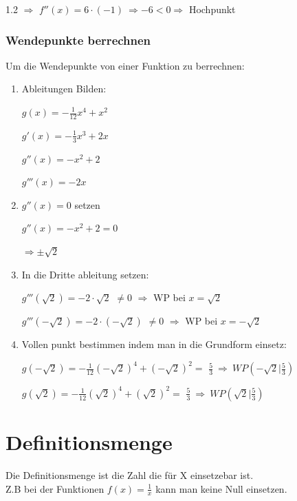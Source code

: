 \documentclass{article}
\newcommand{\Zeilenabstand}{1.2}
\begin{document}
\begin{spacing}{\Zeilenabstand}
    $\Rightarrow$ $f''(x)=6 \cdot (-1) \ \Rightarrow -6 < 0 \Rightarrow$ Hochpunkt

    \subsubsection{Wendepunkte berrechnen}

    Um die Wendepunkte von einer Funktion zu berrechnen:

    \begin{enumerate}
        \item Ableitungen Bilden:

        $g(x)=-\frac{1}{12}x^4+x^2$

        $g'(x)=-\frac{1}{3}x^3+2x$

        $g''(x)=-x^2 + 2$

        $g'''(x)=-2x$

        \item $g''(x)=0$ setzen

        $g''(x)=-x^2+2 = 0$

        $\Rightarrow \pm\sqrt{2}$

        \item In die Dritte ableitung setzen:

        $g'''(\sqrt{2})=-2 \cdot \sqrt{2}$ $\neq 0$ $\Rightarrow$ WP bei $x = \sqrt{2}$

        $g'''(-\sqrt{2})=-2 \cdot (-\sqrt{2})$ $\neq 0$ $\Rightarrow$ WP bei $x = -\sqrt{2}$

        \item Vollen punkt bestimmen indem man in die Grundform einsetz:

        $g(-\sqrt{2})=-\frac{1}{12}(-\sqrt{2})^4+(-\sqrt{2})^2=$  $\frac{5}{3} \ \Rightarrow \ WP(-\sqrt{2} \vert \frac{5}{3}) $

        $g(\sqrt{2})=-\frac{1}{12}(\sqrt{2})^4+(\sqrt{2})^2=$ $\frac{5}{3} \ \Rightarrow \ WP(\sqrt{2} \vert \frac{5}{3}) $



    \end{enumerate}

    \newpage

    \section{Definitionsmenge}

    Die Definitionsmenge ist die Zahl die für X einsetzebar ist.\\
    Z.B bei der Funktionen $f(x)= \frac{1}{x}$ kann man keine Null einsetzen.


\end{spacing}
\end{document}
